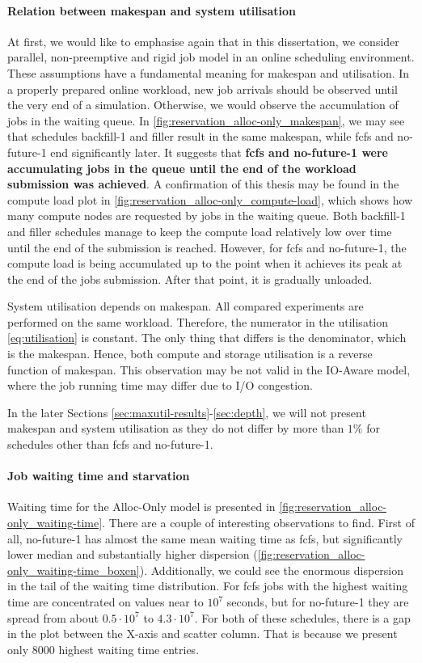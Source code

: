 \documentclass[thesis-en.tex]{subfiles}
\begin{document}
\paragraph{Relation between makespan and system utilisation}
At first, we would like to emphasise again that in this dissertation, we consider parallel, non-preemptive and rigid job model in an online scheduling environment. These assumptions have a fundamental meaning for makespan and utilisation. In a properly prepared online workload, new job arrivals should be observed until the very end of a simulation. Otherwise, we would observe the accumulation of jobs in the waiting queue. In \autoref{fig:reservation_alloc-only_makespan}, we may see that schedules backfill-1 and filler result in the same makespan, while fcfs and no-future-1 end significantly later. It suggests that \textbf{fcfs and no-future-1 were accumulating jobs in the queue until the end of the workload submission was achieved}. A confirmation of this thesis may be found in the compute load plot in \autoref{fig:reservation_alloc-only_compute-load}, which shows how many compute nodes are requested by jobs in the waiting queue. Both backfill-1 and filler schedules manage to keep the compute load relatively low over time until the end of the submission is reached. However, for fcfs and no-future-1, the compute load is being accumulated up to the point when it achieves its peak at the end of the jobs submission. After that point, it is gradually unloaded.

System utilisation depends on makespan. All compared experiments are performed on the same workload. Therefore, the numerator in the utilisation \autoref{eq:utilisation} is constant. The only thing that differs is the denominator, which is the makespan. Hence, both compute and storage utilisation is a reverse function of makespan. This observation may be not valid in the IO-Aware model, where the job running time may differ due to I/O congestion.

In the later Sections \ref{sec:maxutil-results}-\ref{sec:depth}, we will not present makespan and system utilisation as they do not differ by more than $1\%$ for schedules other than fcfs and no-future-1.

\paragraph{Job waiting time and starvation}
Waiting time for the Alloc-Only model is presented in \autoref{fig:reservation_alloc-only_waiting-time}. There are a couple of interesting observations to find. First of all, no-future-1 has almost the same mean waiting time as fcfs, but significantly lower median and substantially higher dispersion (\autoref{fig:reservation_alloc-only_waiting-time_boxen}). Additionally, we could see the enormous dispersion in the tail of the waiting time distribution. For fcfs jobs with the highest waiting time are concentrated on values near to $10^7$ seconds, but for no-future-1 they are spread from about $0.5 \cdot 10^7$ to $4.3 \cdot 10^7$. For both of these schedules, there is a gap in the plot between the X-axis and scatter column. That is because we present only $8000$ highest waiting time entries.
\end{document}
